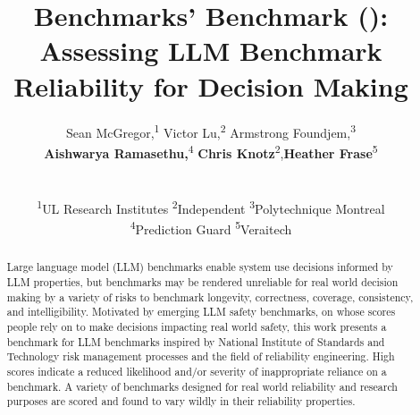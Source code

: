 \documentclass{article}
\title{Benchmarks' Benchmark (\texorpdfstring{\bb}{B2}): Assessing LLM Benchmark Reliability for Decision Making}
\author{%
  Sean McGregor,\textsuperscript{1}
  Victor Lu,\textsuperscript{2}
  Armstrong Foundjem,\textsuperscript{3}\\
  \textbf{Aishwarya Ramasethu,}\textsuperscript{4}
  \textbf{Chris Knotz}\textsuperscript{2},\textbf{Heather Frase}\textsuperscript{5}\\
   \\
  \\
  \textsuperscript{1}UL Research Institutes \textsuperscript{2}Independent
\textsuperscript{3}Polytechnique Montreal
\\
\textsuperscript{4}Prediction Guard
\textsuperscript{5}Veraitech
}
\begin{document}
\maketitle

\begin{abstract}
Large language model (LLM) benchmarks enable system use decisions informed by LLM properties, but benchmarks may be rendered unreliable for real world decision making by a variety of risks to benchmark longevity, correctness, coverage, consistency, and intelligibility. Motivated by emerging LLM safety benchmarks, on whose scores people rely on to make decisions impacting real world safety, this work presents a benchmark for LLM benchmarks inspired by National Institute of Standards and Technology risk management processes and the field of reliability engineering. High scores indicate a reduced likelihood and/or severity of inappropriate reliance on a benchmark. A variety of benchmarks designed for real world reliability and research purposes are scored and found to vary wildly in their reliability properties.
\end{abstract}





\end{document}
